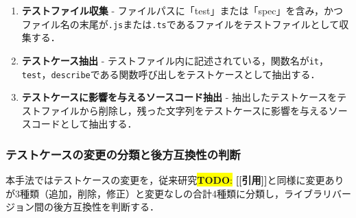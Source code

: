 \documentclass[submit]{ipsj}
\newcommand{\todo}[1]{\colorbox{yellow}{{\bf TODO}:}{\color{red} {\textbf{[#1]}}}}
\begin{document}
\begin{enumerate}
  \item \textbf{テストファイル収集} - ファイルパスに「test」または「spec」を含み，かつファイル名の末尾が{\verb|.js|}または{\verb|.ts|}であるファイルをテストファイルとして収集する．
  \item \textbf{テストケース抽出} - テストファイル内に記述されている，関数名が\verb|it|，\verb|test|，\verb|describe|である関数呼び出しをテストケースとして抽出する．
  \item \textbf{テストケースに影響を与えるソースコード抽出} - 抽出したテストケースをテストファイルから削除し，残った文字列をテストケースに影響を与えるソースコードとして抽出する．
\end{enumerate}



\subsubsection{テストケースの変更の分類と後方互換性の判断}
\label{sec:step1-2}

本手法ではテストケースの変更を，従来研究\todo{[引用]}と同様に変更ありが3種類（追加，削除，修正）と変更なしの合計4種類に分類し，ライブラリバージョン間の後方互換性を判断する．
\end{document}
